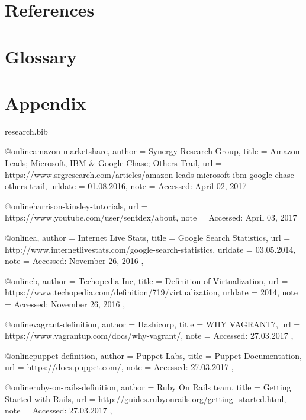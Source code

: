 \documentclass{article}
\begin{document}
\newpage
\section{References}


\renewcommand{\bibname}{}

\newpage
\section{Glossary}
\printglossary
\newpage
\section{Appendix}


\begin{filecontents*}{research.bib}
    
    @online{amazon-marketshare,
        author = {Synergy Research Group},
        title = {Amazon Leads; Microsoft, IBM \& Google Chase; Others Trail},
        url = {https://www.srgresearch.com/articles/amazon-leads-microsoft-ibm-google-chase-others-trail},
        urldate = {01.08.2016},
        note = {Accessed: April 02, 2017}
    }

    @online{harrison-kinsley-tutorials,
        url = {https://www.youtube.com/user/sentdex/about},
        note = {Accessed: April 03, 2017}
    }
    
    @online{a,
        author = {Internet Live Stats},
        title = {Google Search Statistics},
        url = {http://www.internetlivestats.com/google-search-statistics},
        urldate = {03.05.2014},
        note = {Accessed: November 26, 2016}
    },

    @online{b,
        author = {Techopedia Inc},
        title = {Definition of Virtualization},
        url = {https://www.techopedia.com/definition/719/virtualization},
        urldate = {2014},
        note = {Accessed: November 26, 2016}
    },

    @online{vagrant-definition,
        author = {Hashicorp},
        title = {WHY VAGRANT?},
        url = {https://www.vagrantup.com/docs/why-vagrant/},
        note = {Accessed: 27.03.2017}
    },

    @online{puppet-definition,
        author = {Puppet Labs},
        title = {Puppet Documentation},
        url = {https://docs.puppet.com/},
        note = {Accessed: 27.03.2017}
    },

    @online{ruby-on-rails-definition,
        author = {Ruby On Rails team},
        title = {Getting Started with Rails},
        url = {http://guides.rubyonrails.org/getting_started.html},
        note = {Accessed: 27.03.2017}
    },


\end{filecontents*}
\end{document}
